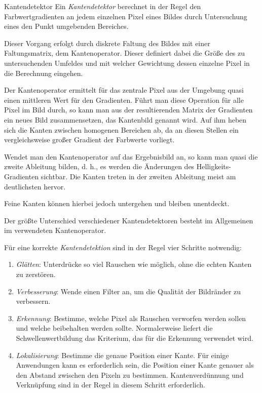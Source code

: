 \begin{defi}{Kantendetektor}
    Ein \emph{Kantendetektor} berechnet in der Regel den Farbwertgradienten an jedem einzelnen Pixel eines Bildes durch Untersuchung eines den Punkt umgebenden Bereiches.

    Dieser Vorgang erfolgt durch diskrete Faltung des Bildes mit einer Faltungsmatrix, dem Kantenoperator.
    Dieser definiert dabei die Größe des zu untersuchenden Umfeldes und mit welcher Gewichtung dessen einzelne Pixel in die Berechnung eingehen.

    Der Kantenoperator ermittelt für das zentrale Pixel aus der Umgebung quasi einen mittleren Wert für den Gradienten.
    Führt man diese Operation für alle Pixel im Bild durch, so kann man aus der resultierenden Matrix der Gradienten ein neues Bild zusammensetzen, das Kantenbild genannt wird.
    Auf ihm heben sich die Kanten zwischen homogenen Bereichen ab, da an diesen Stellen ein vergleichsweise großer Gradient der Farbwerte vorliegt.

    Wendet man den Kantenoperator auf das Ergebnisbild an, so kann man quasi die zweite Ableitung bilden, d. h., es werden die Änderungen des Helligkeits-Gradienten sichtbar.
    Die Kanten treten in der zweiten Ableitung meist am deutlichsten hervor.

    Feine Kanten können hierbei jedoch untergehen und bleiben unentdeckt.

    Der größte Unterschied verschiedener Kantendetektoren besteht im Allgemeinen im verwendeten Kantenoperator.

    Für eine korrekte \emph{Kantendetektion} sind in der Regel vier Schritte notwendig:
    \begin{enumerate}
        \item \emph{Glätten}: Unterdrücke so viel Rauschen wie möglich, ohne die echten Kanten zu zerstören.
        \item \emph{Verbesserung}: Wende einen Filter an, um die Qualität der Bildränder zu verbessern.
        \item \emph{Erkennung}: Bestimme, welche Pixel als Rauschen verworfen werden sollen und welche beibehalten werden sollte. Normalerweise liefert die Schwellenwertbildung das Kriterium, das für die Erkennung verwendet wird.
        \item \emph{Lokalisierung}: Bestimme die genaue Position einer Kante. Für einige Anwendungen kann es erforderlich sein, die Position einer Kante genauer als den Abstand zwischen den Pixeln zu bestimmen. Kantenverdünnung und Verknüpfung sind in der Regel in diesem Schritt erforderlich.
    \end{enumerate}
\end{defi}

